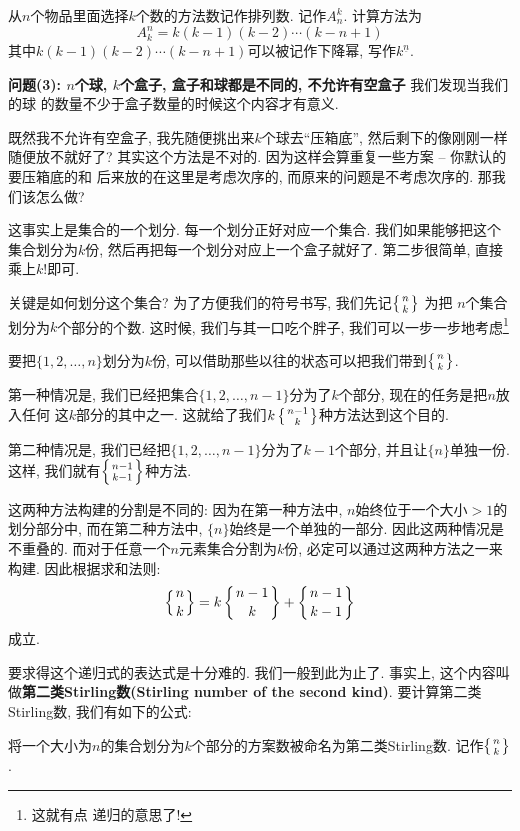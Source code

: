 \begin{definition}[排列数]
    从$n$个物品里面选择$k$个数的方法数记作排列数. 记作$A_n^k$. 计算方法为
    $$
        A_k^n = k(k-1)(k-2)\cdots(k-n+1)
    $$
    其中$k(k-1)(k-2)\cdots(k-n+1)$可以被记作下降幂, 写作$k^{\underline n}$.
\end{definition}

\textbf{问题(3): $n$个球, $k$个盒子, 盒子和球都是不同的, 不允许有空盒子} 我们发现当我们的球
的数量不少于盒子数量的时候这个内容才有意义.

既然我不允许有空盒子, 我先随便挑出来$k$个球去``压箱底'', 然后剩下的像刚刚一样
随便放不就好了? 其实这个方法是不对的. 因为这样会算重复一些方案 -- 你默认的要压箱底的和
后来放的在这里是考虑次序的, 而原来的问题是不考虑次序的. 那我们该怎么做?

这事实上是集合的一个划分. 每一个划分正好对应一个集合. 我们如果能够把这个集合划分为$k$份,
然后再把每一个划分对应上一个盒子就好了. 第二步很简单, 直接乘上$k!$即可.

关键是如何划分这个集合? 为了方便我们的符号书写, 我们先记$\left\{{n \atop k}\right\}$ 为把
$n$个集合划分为$k$个部分的个数. 这时候, 我们与其一口吃个胖子, 我们可以一步一步地考虑\footnote{这就有点
    递归的意思了!  }

要把$\{1,2,\ldots,n\}$划分为$k$份, 可以借助那些以往的状态可以把我们带到$\left\{{n \atop k}\right\}$.

第一种情况是, 我们已经把集合$\{1,2,\ldots,{n-1}\}$分为了$k$个部分, 现在的任务是把$n$放入任何
这$k$部分的其中之一. 这就给了我们$k\left\{{n-1 \atop k}\right\}$种方法达到这个目的.

第二种情况是, 我们已经把$\{1,2,\ldots,{n-1}\}$分为了$k-1$个部分, 并且让$\{n\}$单独一份.
这样, 我们就有$\left\{{n-1 \atop k-1}\right\}$种方法.

这两种方法构建的分割是不同的: 因为在第一种方法中, $n$始终位于一个大小$>1$的划分部分中,
而在第二种方法中, $\{n\}$始终是一个单独的一部分. 因此这两种情况是不重叠的.
而对于任意一个$n$元素集合分割为$k$份, 必定可以通过这两种方法之一来构建. 因此根据求和法则:
$$
    \left\{{n \atop k}\right\}=k\left\{{n-1 \atop k}\right\}+\left\{{n-1 \atop k-1}\right\}
$$
成立.

要求得这个递归式的表达式是十分难的. 我们一般到此为止了. 事实上, 这个内容叫做{\textbf{第二类Stirling数(Stirling number of the second kind)}}.
要计算第二类Stirling数, 我们有如下的公式:

\begin{definition}[第二类Stirling数]
    将一个大小为$n$的集合划分为$k$个部分的方案数被命名为第二类Stirling数. 记作$\left\{{n \atop k}\right\}$.
\end{definition}

